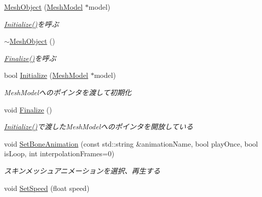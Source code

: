 \begin{DoxyCompactItemize}
\item 
\mbox{\hyperlink{class_k___graphics_1_1_mesh_object_af59273310f07f67f766f9e90323ce641}{Mesh\+Object}} (\mbox{\hyperlink{class_k___graphics_1_1_mesh_model}{Mesh\+Model}} $\ast$model)
\begin{DoxyCompactList}\small\item\em \mbox{\hyperlink{class_k___graphics_1_1_mesh_object_a248233630419973244851f5d2070b5aa}{Initialize()}}を呼ぶ \end{DoxyCompactList}\item 
\mbox{\hyperlink{class_k___graphics_1_1_mesh_object_ae8c3f648521b8c14da19fa53fe1656f3}{$\sim$\+Mesh\+Object}} ()
\begin{DoxyCompactList}\small\item\em \mbox{\hyperlink{class_k___graphics_1_1_mesh_object_a2d7f1695e98aeba276e2f61b0bca00ab}{Finalize()}}を呼ぶ \end{DoxyCompactList}\item 
bool \mbox{\hyperlink{class_k___graphics_1_1_mesh_object_a248233630419973244851f5d2070b5aa}{Initialize}} (\mbox{\hyperlink{class_k___graphics_1_1_mesh_model}{Mesh\+Model}} $\ast$model)
\begin{DoxyCompactList}\small\item\em Mesh\+Modelへのポインタを渡して初期化 \end{DoxyCompactList}\item 
void \mbox{\hyperlink{class_k___graphics_1_1_mesh_object_a2d7f1695e98aeba276e2f61b0bca00ab}{Finalize}} ()
\begin{DoxyCompactList}\small\item\em \mbox{\hyperlink{class_k___graphics_1_1_mesh_object_a248233630419973244851f5d2070b5aa}{Initialize()}}で渡した\+Mesh\+Modelへのポインタを開放している \end{DoxyCompactList}\item 
void \mbox{\hyperlink{class_k___graphics_1_1_mesh_object_a53fca52d8b8b1abb8d91f666f97bb9ea}{Set\+Bone\+Animation}} (const std\+::string \&animation\+Name, bool play\+Once, bool is\+Loop, int interpolation\+Frames=0)
\begin{DoxyCompactList}\small\item\em スキンメッシュアニメーションを選択、再生する \end{DoxyCompactList}\item 
void \mbox{\hyperlink{class_k___graphics_1_1_mesh_object_ad45fbf9cf32b22335eeb994bfe3e1041}{Set\+Speed}} (float speed)

\end{DoxyCompactItemize}
